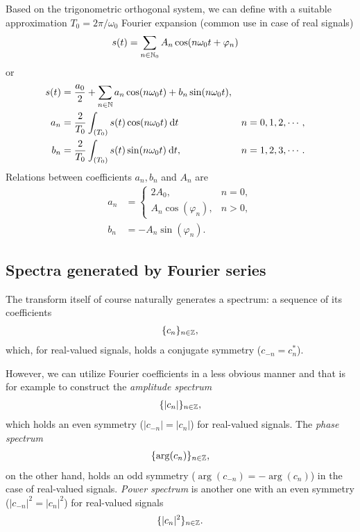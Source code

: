 \documentclass[11pt,a4paper]{report}
\theoremstyle{remark}
\theoremstyle{definition}
\begin{document}
					Based on the trigonometric orthogonal system, we can define with a suitable approximation $T_0 = 2 \pi / \omega_0$ Fourier expansion (common use in case of real signals)
					\begin{align}
					\label{def:trigfs}
					s(t) &= \sum_{n \in {\mathbb N}_0} A_n \cos(n \omega_0 t + \varphi_n)
					\end{align}
					or
					\begin{align}
						\label{def:sincosfs}
						s(t) &= \frac{a_0}{2} + \sum_{n \in {\mathbb N}} a_n \cos(n \omega_0 t) + b_n \sin(n \omega_0 t),
					\\
						a_n &= \frac{2}{T_0} \int_{(T_0)} s(t) \cos(n \omega_0 t) \: {\mathrm d} t
					&
						n &= 0, 1, 2, \cdots,
					\\
						b_n &= \frac{2}{T_0} \int_{(T_0)} s(t) \sin(n \omega_0 t) \: {\mathrm d} t,
					&
						n &= 1, 2, 3, \cdots.
					\end{align}
					Relations between coefficients $a_n, b_n$ and $A_n$ are
					\begin{align}
						a_n &= \left\{ \begin{matrix}
								2 A_0, & n = 0, \\
								A_n \cos(\varphi_n), & n > 0,
							\end{matrix} \right.
					\\
						b_n &= -A_n \sin(\varphi_n).
					\end{align}
					
				
			\subsection{Spectra generated by Fourier series}
				
					The transform itself of course naturally generates a spectrum: a sequence of its coefficients
					\begin{align}
						\label{def:basespec}
						\{ c_n \}_{n \in {\mathbb Z}},
					\end{align}
					which, for real-valued signals, holds a conjugate symmetry ($c_{-n} = c_n^*$).
					
					However, we can utilize Fourier coefficients in a less obvious manner and that is for example to construct the \textit{amplitude spectrum}
					\begin{align}
						\label{def:ampspec}
						\{ |c_n| \}_{n \in {\mathbb Z}},
					\end{align}
					which holds an even symmetry ($|c_{-n}| = |c_{n}|$) for real-valued signals. The \textit{phase spectrum}
					\begin{align}
						\label{def:phasespec}
						\{ \arg(c_n) \}_{n \in {\mathbb Z}},
					\end{align}
					on the other hand, holds an odd symmetry ($\arg(c_{-n}) = -\arg(c_n)$) in the case of real-valued signals. \textit{Power spectrum} is another one with an even symmetry ($|c_{-n}|^2 = |c_n|^2$) for real-valued signals
					\begin{align}
						\label{def:powerspec}
						\{ |c_n|^2 \}_{n \in {\mathbb Z}}.
					\end{align}
					
\end{document}
